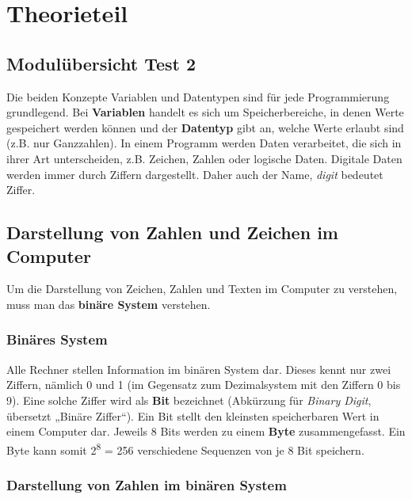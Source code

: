 \documentclass[10pt,paper=17cm:22cm, twoside=true, DIV=14]{scrbook}
\begin{document}
\clearpage \begingroup \let\clearpage\relax \let\cleardoublepage\relax \chapter{ Theorieteil } \endgroup 

\section{Modulübersicht Test 2}\label{modulubersicht-test-2}

Die beiden Konzepte Variablen und Datentypen sind für jede
Programmierung grundlegend. Bei \textbf{Variablen} handelt es sich um
Speicherbereiche, in denen Werte gespeichert werden können und der
\textbf{Datentyp} gibt an, welche Werte erlaubt sind (z.B. nur
Ganzzahlen). In einem Programm werden Daten verarbeitet, die sich in
ihrer Art unterscheiden, z.B. Zeichen, Zahlen oder logische Daten.
Digitale Daten werden immer durch Ziffern dargestellt. Daher auch der
Name, \emph{digit} bedeutet Ziffer.

\section{Darstellung von Zahlen und Zeichen im
Computer}\label{darstellung-von-zahlen-und-zeichen-im-computer}

Um die Darstellung von Zeichen, Zahlen und Texten im Computer zu
verstehen, muss man das \textbf{binäre System} verstehen.

\subsection{Binäres System}\label{binares-system}

Alle Rechner stellen Information im binären System dar. Dieses kennt nur
zwei Ziffern, nämlich 0 und 1 (im Gegensatz zum Dezimalsystem mit den
Ziffern 0 bis 9). Eine solche Ziffer wird als \textbf{Bit} bezeichnet
(Abkürzung für \emph{Binary Digit}, übersetzt „Binäre Ziffer``). Ein Bit
stellt den kleinsten speicherbaren Wert in einem Computer dar. Jeweils 8
Bits werden zu einem \textbf{Byte} zusammengefasst. Ein Byte kann somit
2\textsuperscript{8} = 256 verschiedene Sequenzen von je 8 Bit
speichern.

\subsection{Darstellung von Zahlen im binären
System}\label{darstellung-von-zahlen-im-binaren-system}
\end{document}
